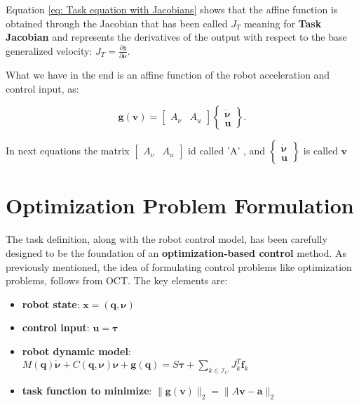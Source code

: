 Equation \eqref{eq: Task equation with Jacobians} shows that the affine function is obtained through the Jacobian that has been called $J_{T}$ meaning for \textbf{Task Jacobian} and represents the derivatives of the output with respect to the base generalized velocity: $J_{T} = \frac{\partial y}{\partial \bm{\nu}}$.

What we have in the end is an affine function of the robot acceleration and control input, as:

\begin{equation}
        \mathbf{g}(\mathbf{v}) = \begin{bmatrix}
            A_{\nu} & A_{u}
        \end{bmatrix} \begin{Bmatrix}
            \bm{\dot{\nu}} \\
            \mathbf{u}
        \end{Bmatrix}.
        \label{eq: Affine preliminar function}
\end{equation}

In next equations the matrix $\begin{bmatrix}
            A_{\nu} & A_{u}
        \end{bmatrix}$ id called 'A' , and  $\begin{Bmatrix}
            \bm{\dot{\nu}} \\
            \mathbf{u}
        \end{Bmatrix}$ is called $\mathbf{v}$

\section{Optimization Problem Formulation}
\label{sec:Optimization Problem Formulation}

The task definition, along with the robot control model, has been carefully designed to be the foundation of an \textbf{optimization-based control} method.
As previously mentioned, the idea of formulating control problems like optimization problems, follows from OCT.
The key elements are:

\begin{itemize}
    \item \textbf{robot state}: $\mathbf{x} = (\mathbf{q},\bm{\nu})$
    \item \textbf{control input}: $\mathbf{u} = \bm{\tau}$
    \item \textbf{robot dynamic model}: $ M(\mathbf{q})\dot{\bm{\nu}} + C(\mathbf{q},\bm{\nu})\bm{\nu} + \mathbf{g}(\mathbf{q}) = S\bm{\tau} + \sum_{k \in \mathcal{I}_C} J^{T}_{k}\mathbf{f}_{k}$
    \item \textbf{task function to minimize}: $\|\mathbf{g}(\mathbf{v})\|_2 = \| A\mathbf{v} - \mathbf{a}\|_2$
\end{itemize}

